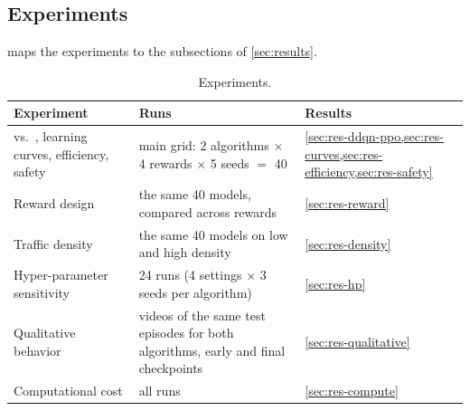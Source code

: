 \subsection{Experiments}
 maps the experiments to the subsections of \cref{sec:results}.

\begin{table}[H]
  \centering
  \small
  \caption{Experiments.}
  \label{tab:experiments}
  \begin{tabularx}{\linewidth}{@{}XXl@{}}
    \toprule
    Experiment & Runs & Results \\
    \midrule
    \ddqn{} vs.\ \ppo{}, learning curves, efficiency, safety
      & main grid: 2 algorithms $\times$ 4 rewards $\times$ 5 seeds $=$ 40
      & \cref{sec:res-ddqn-ppo,sec:res-curves,sec:res-efficiency,sec:res-safety} \\
    Reward design & the same 40 models, compared across rewards & \cref{sec:res-reward} \\
    Traffic density & the same 40 models on low and high density & \cref{sec:res-density} \\
    Hyper-parameter sensitivity & 24 runs (4 settings $\times$ 3 seeds per algorithm) & \cref{sec:res-hp} \\
    Qualitative behavior & videos of the same test episodes for both algorithms, early and final checkpoints
      & \cref{sec:res-qualitative} \\
    Computational cost & all runs & \cref{sec:res-compute} \\
    \bottomrule
  \end{tabularx}
\end{table}

